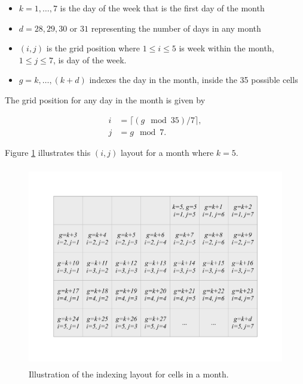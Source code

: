 \documentclass[article]{jss}
\providecommand{\tightlist}{%
  \setlength{\itemsep}{0pt}\setlength{\parskip}{0pt}}
\begin{document}
\begin{itemize}
\tightlist
\item
  \(k = 1, \dots , 7\) is the day of the week that is the first day of
  the month
\item
  \(d = 28, 29, 30\) or \(31\) representing the number of days in any
  month
\item
  \((i, j)\) is the grid position where \(1 \le i \le 5\) is week within
  the month, \(1 \le j \le 7\), is day of the week.
\item
  \(g = k, \dots,(k+d)\) indexes the day in the month, inside the 35
  possible cells
\end{itemize}

The grid position for any day in the month is given by

\begin{equation}
  \begin{aligned}
  i &= \lceil (g \mod 35) / 7\rceil, \\
  j &= g \mod 7. \label{eq:grid}
  \end{aligned}
\end{equation}

Figure \ref{fig:month-diagram} illustrates this \((i,j)\) layout for a
month where \(k=5\).

\begin{CodeChunk}
\begin{figure}

{\centering \includegraphics[width=360pt,height=250pt]{figure/month} 

}

\caption[Illustration of the indexing layout for cells in a month]{Illustration of the indexing layout for cells in a month.}\label{fig:month-diagram}
\end{figure}
\end{CodeChunk}
\end{document}
